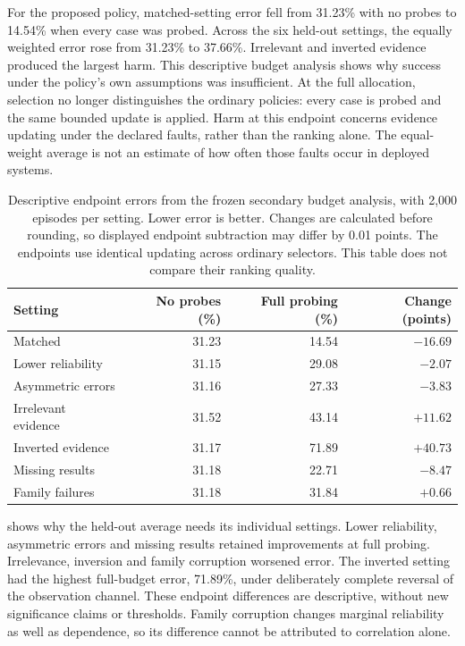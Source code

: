 For the proposed policy, matched-setting error fell from 31.23\% with no probes to 14.54\% when every case was probed. Across the
six held-out settings, the equally weighted error rose from 31.23\% to 37.66\%. Irrelevant and inverted evidence produced the
largest harm. This descriptive budget analysis shows why success under the policy's own assumptions was insufficient.
At the full allocation, selection no longer distinguishes the ordinary policies: every case is probed and the same bounded
update is applied. Harm at this endpoint concerns evidence updating under the declared faults, rather than the ranking alone.
The equal-weight average is not an estimate of how often those faults occur in deployed systems.

\begin{table}[htbp]
  \centering
  \begin{tabular}{@{}lrrr@{}}
    \toprule
    Setting & No probes (\%) & Full probing (\%) & Change (points) \\
    \midrule
    Matched & 31.23 & 14.54 & $-16.69$ \\
    Lower reliability & 31.15 & 29.08 & $-2.07$ \\
    Asymmetric errors & 31.16 & 27.33 & $-3.83$ \\
    Irrelevant evidence & 31.52 & 43.14 & $+11.62$ \\
    Inverted evidence & 31.17 & 71.89 & $+40.73$ \\
    Missing results & 31.18 & 22.71 & $-8.47$ \\
    Family failures & 31.18 & 31.84 & $+0.66$ \\
    \bottomrule
  \end{tabular}
  \caption{Descriptive endpoint errors from the frozen secondary budget analysis, with 2,000 episodes per setting.
  Lower error is better. Changes are calculated before rounding, so displayed endpoint subtraction may differ by 0.01 points.
  The endpoints use identical updating across ordinary selectors. This table does not compare their ranking quality.}
  \label{tab:acquisition-endpoints}
\end{table}

 shows why the held-out average needs its individual settings. Lower reliability, asymmetric
errors and missing results retained improvements at full probing. Irrelevance, inversion and family corruption worsened error.
The inverted setting had the highest full-budget error, 71.89\%, under deliberately complete reversal of the observation channel.
These endpoint differences are descriptive, without new significance claims or thresholds. Family corruption changes marginal
reliability as well as dependence, so its difference cannot be attributed to correlation alone.

